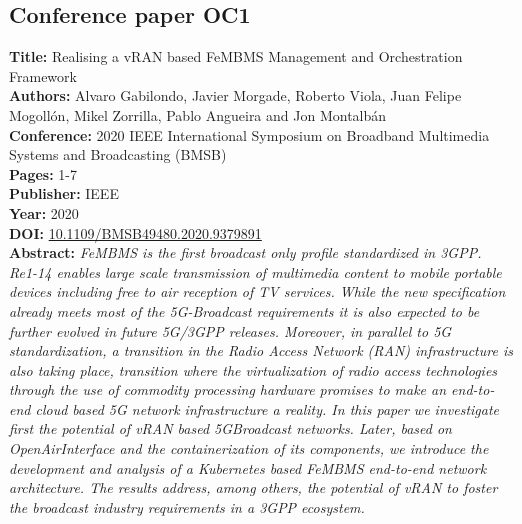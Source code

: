 \subsection{Conference paper OC1}
\label{chap:BMSB2020-1}
\textbf{Title:} Realising a vRAN based FeMBMS Management and Orchestration Framework \\
\textbf{Authors:} Alvaro Gabilondo, Javier Morgade, Roberto Viola, Juan Felipe Mogollón, Mikel Zorrilla, Pablo Angueira and Jon Montalbán \\
\textbf{Conference:} 2020 IEEE International Symposium on Broadband Multimedia Systems and Broadcasting (BMSB) \\
\textbf{Pages:} 1-7 \\
\textbf{Publisher:} IEEE \\
\textbf{Year:} 2020 \\
\textbf{DOI:} \url{10.1109/BMSB49480.2020.9379891} \\
\textbf{Abstract:} \textit{FeMBMS is the first broadcast only profile standardized in 3GPP. Re1-14 enables large scale transmission of multimedia content to mobile portable devices including free to air reception of TV services. While the new specification already meets most of the 5G-Broadcast requirements it is also expected to be further evolved in future 5G/3GPP releases. Moreover, in parallel to 5G standardization, a transition in the Radio Access Network (RAN) infrastructure is also taking place, transition where the virtualization of radio access technologies through the use of commodity processing hardware promises to make an end-to-end cloud based 5G network infrastructure a reality. In this paper we investigate first the potential of vRAN based 5GBroadcast networks. Later, based on OpenAirInterface and the containerization of its components, we introduce the development and analysis of a Kubernetes based FeMBMS end-to-end network architecture. The results address, among others, the potential of vRAN to foster the broadcast industry requirements in a 3GPP ecosystem.} \\
\hrulefill

